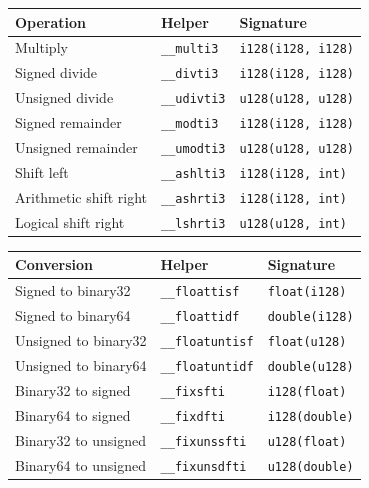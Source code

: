 \documentclass[10pt,twoside]{article}
\begin{document}
\Needspace{2.7in}
\begingroup\footnotesize
\setlength{\tabcolsep}{2pt}
\begin{longtable}{@{}p{1.55in}p{1.55in}p{2.45in}@{}}
\toprule
\textbf{Operation} & \textbf{Helper} & \textbf{Signature}\\
\midrule
\endhead
Multiply & \texttt{\_\allowbreak{}\_\allowbreak{}multi3} & \texttt{i128(i128, i128)}\\
Signed divide & \texttt{\_\allowbreak{}\_\allowbreak{}divti3} & \texttt{i128(i128, i128)}\\
Unsigned divide & \texttt{\_\allowbreak{}\_\allowbreak{}udivti3} & \texttt{u128(u128, u128)}\\
Signed remainder & \texttt{\_\allowbreak{}\_\allowbreak{}modti3} & \texttt{i128(i128, i128)}\\
Unsigned remainder & \texttt{\_\allowbreak{}\_\allowbreak{}umodti3} & \texttt{u128(u128, u128)}\\
Shift left & \texttt{\_\allowbreak{}\_\allowbreak{}ashlti3} & \texttt{i128(i128, int)}\\
Arithmetic shift right & \texttt{\_\allowbreak{}\_\allowbreak{}ashrti3} & \texttt{i128(i128, int)}\\
Logical shift right & \texttt{\_\allowbreak{}\_\allowbreak{}lshrti3} & \texttt{u128(u128, int)}\\
\bottomrule
\end{longtable}
\endgroup

\begingroup\footnotesize
\setlength{\tabcolsep}{2pt}
\begin{longtable}{@{}p{1.55in}p{1.55in}p{2.45in}@{}}
\toprule
\textbf{Conversion} & \textbf{Helper} & \textbf{Signature}\\
\midrule
\endhead
Signed to binary32 & \texttt{\_\allowbreak{}\_\allowbreak{}floattisf} & \texttt{float(i128)}\\
Signed to binary64 & \texttt{\_\allowbreak{}\_\allowbreak{}floattidf} & \texttt{double(i128)}\\
Unsigned to binary32 & \texttt{\_\allowbreak{}\_\allowbreak{}floatuntisf} & \texttt{float(u128)}\\
Unsigned to binary64 & \texttt{\_\allowbreak{}\_\allowbreak{}floatuntidf} & \texttt{double(u128)}\\
Binary32 to signed & \texttt{\_\allowbreak{}\_\allowbreak{}fixsfti} & \texttt{i128(float)}\\
Binary64 to signed & \texttt{\_\allowbreak{}\_\allowbreak{}fixdfti} & \texttt{i128(double)}\\
Binary32 to unsigned & \texttt{\_\allowbreak{}\_\allowbreak{}fixunssfti} & \texttt{u128(float)}\\
Binary64 to unsigned & \texttt{\_\allowbreak{}\_\allowbreak{}fixunsdfti} & \texttt{u128(double)}\\
\bottomrule
\end{longtable}
\endgroup
\end{document}
